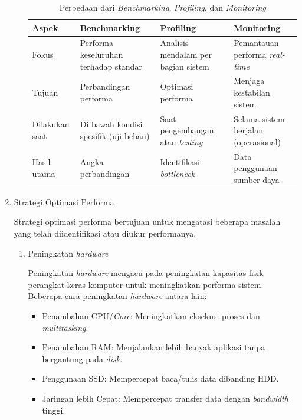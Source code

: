 \documentclass[12pt]{article}
\begin{document}
\begin{enumerate}
\begin{enumerate}
            \begin{table}[htbp]
            \centering
                \begin{tabular}{|p{2cm}|p{3cm}|p{3cm}|p{3cm}|}
                \hline
                Aspek & Benchmarking & Profiling & Monitoring \\
                \hline
                Fokus & Performa keseluruhan terhadap standar & Analisis mendalam per bagian sistem & Pemantauan performa \textit{real-time} \\
                \hline
                Tujuan & Perbandingan performa & Optimasi performa & Menjaga kestabilan sistem \\
                \hline
                Dilakukan saat & Di bawah kondisi spesifik (uji beban) & Saat pengembangan atau \textit{testing} & Selama sistem berjalan (operasional) \\
                \hline
                Hasil utama & Angka perbandingan & Identifikasi \textit{bottleneck} & Data penggunaan sumber daya \\
                \hline
                \end{tabular}
                \caption{Perbedaan dari \textit{Benchmarking}, \textit{Profiling}, dan \textit{Monitoring}}
                \label{table:ringkasan_perbedaan}
            \end{table}
        \end{enumerate}
            
    \item {Strategi Optimasi Performa}
    \par Strategi optimasi performa bertujuan untuk mengatasi beberapa masalah yang telah diidentifikasi atau diukur performanya\cite{3.2.4GeeksforGeeks2024}.
        \begin{enumerate}
            \item Peningkatan \textit{hardware}
            \par Peningkatan \textit{hardware} mengacu pada peningkatan kapasitas fisik perangkat keras komputer untuk meningkatkan performa sistem. Beberapa cara peningkatan \textit{hardware} antara lain:
            \begin{itemize}
                \item Penambahan CPU/\textit{Core}: Meningkatkan eksekusi proses dan \textit{multitasking}.
                \item Penambahan RAM: Menjalankan lebih banyak aplikasi tanpa bergantung pada \textit{disk}.
                \item Penggunaan SSD: Mempercepat baca/tulis data dibanding HDD.
                \item Jaringan lebih Cepat: Mempercepat transfer data dengan \textit{bandwidth} tinggi.
            \end{itemize}
            

\end{enumerate}
\end{enumerate}
\end{document}
